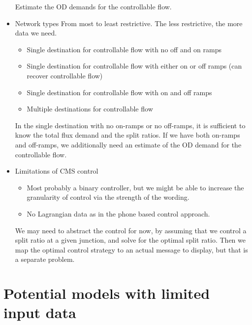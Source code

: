 \documentclass[10pt,a4paper]{article}
\begin{document}
\begin{itemize}
	Estimate the OD demands for the controllable flow.
\item Network types
From most to least restrictive. The less restrictive, the more data we need.
	\begin{itemize}
	\item Single destination for controllable flow with no off and on ramps
	\item Single destination for controllable flow with either on or off ramps (can recover controllable flow)
	\item Single destination for controllable flow with on and off ramps
	\item Multiple destinations for controllable flow
	\end{itemize}
	In the single destination with no on-ramps or no off-ramps, it is sufficient to know the total flux demand and the split ratios. If we have both on-ramps and off-ramps, we additionally need an estimate of the OD demand for the controllable flow.
\item  Limitations of CMS control
	\begin{itemize}
	\item Most probably a binary controller, but we might be able to increase the granularity of control via the strength of the wording. 
	\item No Lagrangian data as in the phone based control approach.
	\end{itemize}
	We may need to abstract the control for now, by assuming that we control a split ratio at a given junction, and solve for the optimal split ratio. Then we map the optimal control strategy to an actual message to display, but that is a separate problem.
\end{itemize}




\section{Potential models with limited input data}

\end{document}
